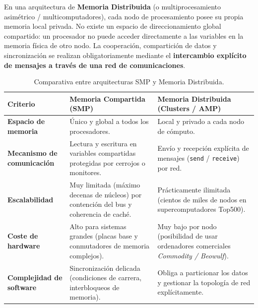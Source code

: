 \begin{definicion}
En una arquitectura de \textbf{Memoria Distribuida} (o multiprocesamiento asimétrico / multicomputadores), cada nodo de procesamiento posee su propia memoria local privada. No existe un espacio de direccionamiento global compartido: un procesador no puede acceder directamente a las variables en la memoria física de otro nodo. La cooperación, compartición de datos y sincronización se realizan obligatoriamente mediante el \textbf{intercambio explícito de mensajes a través de una red de comunicaciones}.
\end{definicion}

\begin{table}[htbp]
\centering
\small
\begin{tabular}{>{\raggedright\arraybackslash}p{3.0cm}>{\raggedright\arraybackslash}p{5.5cm}>{\raggedright\arraybackslash}p{5.5cm}}
\toprule
\textbf{Criterio} & \textbf{Memoria Compartida (SMP)} & \textbf{Memoria Distribuida (Clusters / AMP)} \\
\midrule
\textbf{Espacio de memoria} & Único y global a todos los procesadores. & Local y privado a cada nodo de cómputo. \\
\addlinespace
\textbf{Mecanismo de comunicación} & Lectura y escritura en variables compartidas protegidas por cerrojos o monitores. & Envío y recepción explícita de mensajes (\texttt{send} / \texttt{receive}) por red. \\
\addlinespace
\textbf{Escalabilidad} & Muy limitada (máximo decenas de núcleos) por contención del bus y coherencia de caché. & Prácticamente ilimitada (cientos de miles de nodos en supercomputadores Top500). \\
\addlinespace
\textbf{Coste de hardware} & Alto para sistemas grandes (placas base y conmutadores de memoria complejos). & Muy bajo por nodo (posibilidad de usar ordenadores comerciales \emph{Commodity / Beowulf}). \\
\addlinespace
\textbf{Complejidad de software} & Sincronización delicada (condiciones de carrera, interbloqueos de memoria). & Obliga a particionar los datos y gestionar la topología de red explícitamente. \\
\bottomrule
\end{tabular}
\caption{Comparativa entre arquitecturas SMP y Memoria Distribuida.}
\label{tab:smp_vs_amp}
\end{table}

